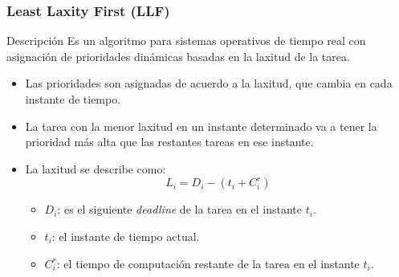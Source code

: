 \begin{frame}
    \frametitle{ Least Laxity First (\textbf{LLF}) }

    \begin{exampleblock}{Descripción}
        Es un algoritmo para sistemas operativos de tiempo real con asignación de prioridades dinámicas basadas en la laxitud de la tarea.
    \end{exampleblock}

    \begin{itemize}
        \item Las prioridades son asignadas de acuerdo a la laxitud, que cambia en cada instante de tiempo.
        \item La tarea con la menor laxitud en un instante determinado va a tener la prioridad más alta que las restantes tareas en ese instante.
        \item La laxitud se describe como:
        \begin{equation}
            L_i = D_i - (t_i + C^r_i)
        \end{equation}
        
        \begin{itemize}
            \item $D_i$: es el siguiente \textit{deadline} de la tarea en el instante $t_i$.
            \item $t_i$: el instante de tiempo actual.
            \item $C^r_i$: el tiempo de computación restante de la tarea en el instante $t_i$.
        \end{itemize}
    \end{itemize}
\end{frame}